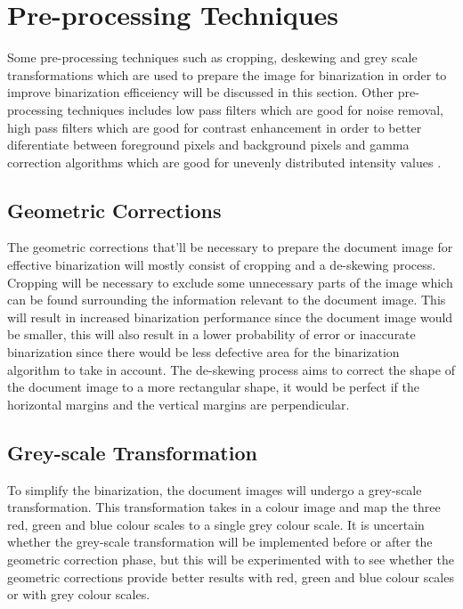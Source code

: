 \documentclass[11pt]{article}
\begin{document}
	\section{Pre-processing Techniques}
		Some pre-processing techniques such as cropping, deskewing and grey scale transformations which are used to prepare the image for binarization in order to improve binarization efficeiency will be discussed in this section. Other pre-processing techniques includes low pass filters which are good for noise removal, high pass filters which are good for contrast enhancement in order to better diferentiate between foreground pixels and background pixels and gamma correction algorithms which are good for unevenly distributed intensity values \cite{soua2015improved}.

		\subsection{Geometric Corrections}
			The geometric corrections that'll be necessary to prepare the document image for effective \sloppy binarization will mostly consist of cropping and a de-skewing process. Cropping will be necessary to exclude some unnecessary parts of the image which can be found surrounding the information relevant to the document image. This will result in increased binarization performance since the document image would be smaller, this will also result in a lower probability of error or inaccurate binarization since there would be less defective area for the binarization algorithm to take in account. The de-skewing process aims to correct the shape of the document image to a more rectangular shape, it would be perfect if the horizontal margins and the vertical margins are perpendicular.%

		\subsection{Grey-scale Transformation}
			To simplify the binarization, the document images will undergo a grey-scale transformation. This transformation takes in a colour image and map the three red, green and blue colour scales to a single grey colour scale. It is uncertain whether the grey-scale transformation will be implemented before or after the geometric correction phase, but this will be experimented with to see whether the geometric corrections provide better results with red, green and blue colour scales or with grey colour scales.
\end{document}
